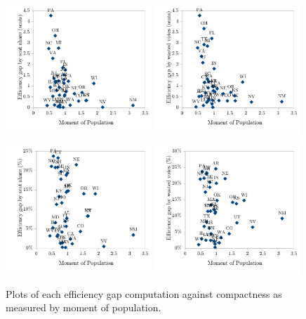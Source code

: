 \documentclass[12pt]{article}
\begin{document}
  \begin{figure}
    \begin{center}
      \includegraphics[width=0.49\textwidth]{sss-moment_pop.pdf}
      \includegraphics[width=0.49\textwidth]{wvs-moment_pop.pdf}

      \includegraphics[width=0.49\textwidth]{ssp-moment_pop.pdf}
      \includegraphics[width=0.49\textwidth]{wvp-moment_pop.pdf}

      \caption{Plots of each efficiency gap computation against compactness as measured by moment of population.\label{f:effgapplots}}
    \end{center}
  \end{figure}
\end{document}
